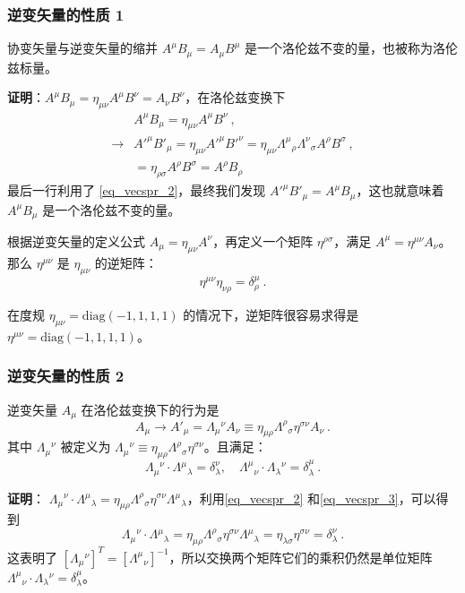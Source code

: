 \subsubsection{逆变矢量的性质 1}
\begin{lemma}{}
协变矢量与逆变矢量的缩并 $A^\mu B_\mu=A_\mu B^\mu$ 是一个洛伦兹不变的量，也被称为洛伦兹标量。
\end{lemma}
\textbf{证明}：$A^\mu B_\mu = \eta_{\mu\nu}A^\mu B^\nu=A_\nu B^\nu$，在洛伦兹变换下 \begin{equation}
\begin{aligned}
&A^\mu B_\mu = \eta_{\mu\nu}A^\mu B^\nu ~,\\
\rightarrow &{A'}^\mu {B'}_\mu =\eta_{\mu\nu}{A'}^\mu {B'}^\nu = \eta_{\mu\nu}\Lambda^{\mu}{}_\rho\Lambda^\nu{}_\sigma A^\rho  B^\sigma~,\\
&=\eta_{\rho\sigma}A^\rho B^\sigma = A^\rho B_\rho
\end{aligned}
\end{equation}
最后一行利用了 \autoref{eq_vecspr_2}，最终我们发现 ${A'}^\mu {B'}_\mu = A^\mu B_\mu $，这也就意味着 $A^\mu B_\mu$ 是一个洛伦兹不变的量。
\begin{lemma}{}
根据逆变矢量的定义公式 $A_\mu = \eta_{\mu\nu}A^\nu$，再定义一个矩阵 $\eta^{\rho\sigma}$，满足 $A^\mu = \eta^{\mu\nu} A_\nu$。那么 $\eta^{\mu\nu}$ 是 $\eta_{\mu\nu}$ 的逆矩阵：
\begin{equation}\label{eq_vecspr_3}
\eta^{\mu\nu}\eta_{\nu\rho}=\delta^{\mu}_\rho~.
\end{equation}
\end{lemma}
在度规 $\eta_{\mu\nu} = \mathrm{diag}(-1,1,1,1)$ 的情况下，逆矩阵很容易求得是 $\eta^{\mu\nu} = \mathrm{diag}(-1,1,1,1)$。
\subsubsection{逆变矢量的性质 2}
\begin{lemma}{}
逆变矢量 $A_\mu$ 在洛伦兹变换下的行为是
\begin{equation}
A_\mu \rightarrow  A'_\mu = \Lambda_{\mu}{}^\nu A_\nu\equiv\eta_{\mu\rho}\Lambda^{\rho}{}_\sigma \eta^{\sigma\nu} A_\nu~.
\end{equation}
其中 $\Lambda_{\mu}{}^\nu$ 被定义为 $\Lambda_\mu{}^\nu \equiv \eta_{\mu\rho}\Lambda^{\rho}{}_\sigma \eta^{\sigma\nu} $。且满足：
\begin{equation}
\Lambda_\mu{}^\nu \cdot \Lambda{}^\mu{}_\lambda = \delta^\nu_\lambda,\quad \Lambda^\mu{}_\nu\cdot \Lambda_\lambda{}^\nu =\delta^\mu_\lambda
~.
\end{equation}
\end{lemma}
\textbf{证明}： $\Lambda_\mu{}^\nu \cdot \Lambda{}^\mu{}_\lambda =\eta_{\mu\rho}\Lambda^{\rho}{}_\sigma \eta^{\sigma\nu} \Lambda{}^\mu{}_\lambda $，利用\autoref{eq_vecspr_2} 和\autoref{eq_vecspr_3}，可以得到
\begin{equation}
\Lambda_\mu{}^\nu \cdot \Lambda{}^\mu{}_\lambda =\eta_{\mu\rho}\Lambda^{\rho}{}_\sigma \eta^{\sigma\nu} \Lambda{}^\mu{}_\lambda=\eta_{\lambda\sigma} \eta^{\sigma\nu}= \delta_\lambda^\nu~.
\end{equation}
这表明了 $[\Lambda_\mu{}^\nu]^T = [\Lambda^\mu{}_\nu]^{-1}$，所以交换两个矩阵它们的乘积仍然是单位矩阵 $\Lambda^\mu{}_\nu \cdot \Lambda_\lambda{}^\nu = \delta_\lambda^\mu$。
